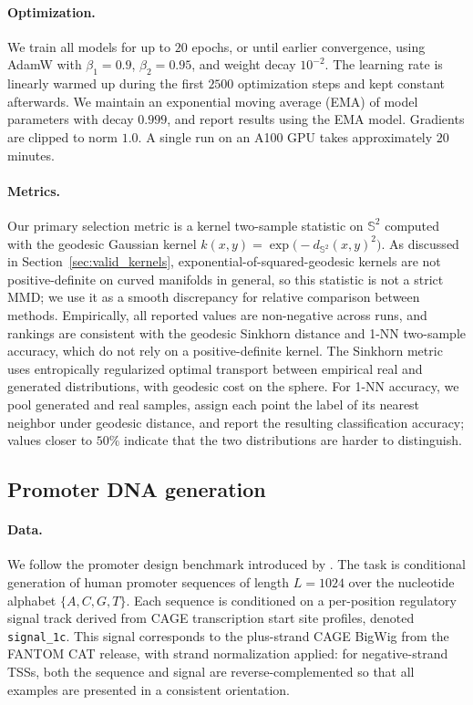 \documentclass{article}
\theoremstyle{plain}
\begin{document}
\paragraph{Optimization.}
We train all models for up to $20$ epochs, or until earlier convergence, using AdamW with $\beta_1=0.9$, $\beta_2=0.95$, and weight decay $10^{-2}$. The learning rate is linearly warmed up during the first $2500$ optimization steps and kept constant afterwards. We maintain an exponential moving average (EMA) of model parameters with decay $0.999$, and report results using the EMA model. Gradients are clipped to norm $1.0$. A single run on an A100 GPU takes approximately $20$ minutes.

\paragraph{Metrics.}
Our primary selection metric is a kernel two-sample statistic on $\mathbb{S}^2$ computed with the geodesic Gaussian kernel $k(x,y) = \exp\!\bigl(-d_{\mathbb{S}^2}(x,y)^2\bigr)$. As discussed in Section~\ref{sec:valid_kernels}, exponential-of-squared-geodesic kernels are not positive-definite on curved manifolds in general, so this statistic is not a strict MMD; we use it as a smooth discrepancy for relative comparison between methods. Empirically, all reported values are non-negative across runs, and rankings are consistent with the geodesic Sinkhorn distance and 1-NN two-sample accuracy, which do not rely on a positive-definite kernel. The Sinkhorn metric uses entropically regularized optimal transport between empirical real and generated distributions, with geodesic cost on the sphere. For 1-NN accuracy, we pool generated and real samples, assign each point the label of its nearest neighbor under geodesic distance, and report the resulting classification accuracy; values closer to $50\%$ indicate that the two distributions are harder to distinguish.

\subsection{Promoter DNA generation}

\paragraph{Data.}
We follow the promoter design benchmark introduced by \citet{avdeyev2023dirichletdiffusionscoremodel}. The task is conditional generation of human promoter sequences of length $L=1024$ over the nucleotide alphabet $\{A,C,G,T\}$. Each sequence is conditioned on a per-position regulatory signal track derived from CAGE transcription start site profiles, denoted \texttt{signal\_1c}. This signal corresponds to the plus-strand CAGE BigWig from the FANTOM CAT release, with strand normalization applied: for negative-strand TSSs, both the sequence and signal are reverse-complemented so that all examples are presented in a consistent orientation.
\end{document}
